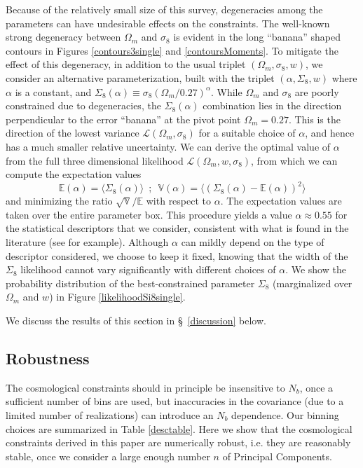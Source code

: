 \documentclass[reprint,aps,prd,superscriptaddress,showkeys,showpacs]{revtex4-1}
\begin{document}
Because of the relatively small size of this survey, degeneracies
among the parameters can have undesirable effects on the constraints.
The well-known strong degeneracy between $\Omega_m$ and $\sigma_8$ is
evident in the long ``banana'' shaped contours in Figures
\ref{contours3single} and \ref{contoursMoments}.  To mitigate the
effect of this degeneracy, in addition to the usual triplet
$(\Omega_m,\sigma_8,w)$, we consider an alternative parameterization,
built with the triplet $(\alpha,\Sigma_8,w)$ where $\alpha$ is a
constant, and
$\Sigma_8(\alpha)\equiv\sigma_8(\Omega_m/0.27)^\alpha$. While
$\Omega_m$ and $\sigma_8$ are poorly constrained due to degeneracies,
the $\Sigma_8(\alpha)$ combination lies in the direction perpendicular
to the error ``banana'' at the pivot point $\Omega_m=0.27$.  
This is the direction of the lowest variance
$\mathcal{L}(\Omega_m,\sigma_8)$ for a suitable choice of $\alpha$,
and hence has a much smaller relative uncertainty. We can derive the
optimal value of $\alpha$ from the full three dimensional likelihood
$\mathcal{L}(\Omega_m,w,\sigma_8)$, from which we can compute the
expectation values
\begin{equation}
\mathds{E}(\alpha) = \langle\Sigma_8(\alpha)\rangle \,\,\, ; \,\,\, \mathds{V}(\alpha) = \langle(\Sigma_8(\alpha)-\mathds{E}(\alpha))^2\rangle
\end{equation}
and minimizing the ratio $\sqrt{\mathds{V}}/\mathds{E}$ with respect
to $\alpha$. The expectation values are taken over the entire parameter box. 
This procedure yields a value $\alpha\approx0.55$ for the
statistical descriptors that we consider, 
consistent with what is found in the literature (see \citep{CFHTKilbinger} for example). Although $\alpha$ can mildly depend on the type of descriptor considered, we choose to keep it fixed, knowing that the width of the $\Sigma_8$ likelihood cannot vary significantly with different choices of $\alpha$.  
We show the probability distribution of the best-constrained parameter
$\Sigma_8$ (marginalized over $\Omega_m$ and $w$) in Figure
\ref{likelihoodSi8single}. 

We discuss the results of this section in \S~\ref{discussion} below.


\subsection{Robustness}

The cosmological constraints should in principle be insensitive to
$N_b$, once a sufficient number of bins are used, but inaccuracies in
the covariance (due to a limited number of realizations) can introduce
an $N_b$ dependence. Our binning choices are summarized in Table \ref{desctable}.  
Here we show that the cosmological constraints
derived in this paper are numerically robust, i.e. they are reasonably
stable, once we consider a large enough number $n$ of Principal
Components. 
\end{document}
